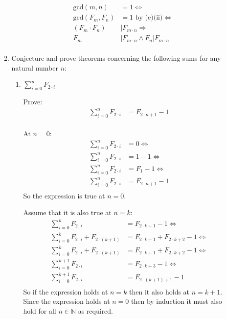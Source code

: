 \documentclass[10pt,\jkfside,a4paper]{article}
\begin{document}
\begin{enumerate}
\begin{enumerate}
\begin{equation}
\begin{split}
\text{gcd}(m, n) &= 1 \Longleftrightarrow\\
\text{gcd}(F_m, F_n) &= 1 \text{ by (e)(ii)} \Longleftrightarrow\\
(F_m \cdot F_n) &| F_{m \cdot n} \Longrightarrow\\
F_m &| F_{m \cdot n} \wedge F_n | F_{m\cdot n}\\
\end{split}
\end{equation}

\item Conjecture and prove theorems concerning the following sums for any natural number $n$:

\begin{enumerate}[label = (\roman*)]

\item $\sum^n_{i = 0} F_{2\cdot i}$

Prove:
\begin{equation}\label{sumfevens}
\begin{split}
\sum^n_{i = 0} F_{2 \cdot i} &= F_{2 \cdot n + 1} - 1\\
\end{split}
\end{equation}

At $n = 0$:
\begin{equation}
\begin{split}
\sum^n_{i = 0} F_{2 \cdot i} &= 0 \Longleftrightarrow\\
\sum^n_{i = 0} F_{2 \cdot i} &= 1 - 1 \Longleftrightarrow\\
\sum^n_{i = 0} F_{2 \cdot i} &= F_1 - 1 \Longleftrightarrow\\
\sum^n_{i = 0} F_{2 \cdot i} &= F_{2 \cdot n + 1} - 1 \\
\end{split}
\end{equation}
So the expression is true at $n = 0$.

Assume that it is also true at $n = k$:
\begin{equation}
\begin{split}
\sum^k_{i = 0} F_{2 \cdot i} &= F_{2 \cdot k + 1} - 1\Longleftrightarrow\\
\sum^k_{i = 0} F_{2 \cdot i} + F_{2 \cdot (k + 1)} &= F_{2 \cdot k + 1} + F_{2 \cdot k + 2} - 1\Longleftrightarrow\\
\sum^k_{i = 0} F_{2 \cdot i} + F_{2 \cdot (k + 1)} &= F_{2 \cdot k + 1} + F_{2 \cdot k + 2} - 1\Longleftrightarrow\\
\sum^{k + 1}_{i = 0} F_{2 \cdot i} &= F_{2 \cdot k + 3} - 1\Longleftrightarrow\\
\sum^{k + 1}_{i = 0} F_{2 \cdot i} &= F_{2 \cdot (k + 1) + 1} - 1 \\
\end{split}
\end{equation}
So if the expression holds at $n = k$ then it also holds at $n = k + 1$. Since the expression holds at $n = 0$ then 
by induction it must also hold for all $n \in \mathbb{N}$ as required.


\end{enumerate}
\end{enumerate}
\end{enumerate}
\end{document}

